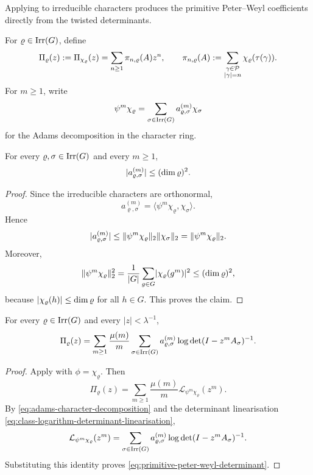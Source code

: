 Applying  to irreducible
characters produces the primitive Peter--Weyl coefficients directly
from the twisted determinants.

For \(\varrho\in\operatorname{Irr}(G)\), define
\begin{equation}\label{eq:primitive-peter-weyl-series}
  \Pi_\varrho(z):=\Pi_{\chi_\varrho}(z)
  =\sum_{n\ge 1}\pi_{n,\varrho}(A)z^n,
  \qquad
  \pi_{n,\varrho}(A)
  :=\sum_{\substack{\gamma\in\mathcal P\\ |\gamma|=n}}
    \chi_\varrho(\tau(\gamma)).
\end{equation}
For \(m\ge 1\), write
\begin{equation}\label{eq:adams-character-decomposition}
  \psi^m\chi_\varrho
  =\sum_{\sigma\in\operatorname{Irr}(G)}a_{\varrho,\sigma}^{(m)}\chi_\sigma
\end{equation}
for the Adams decomposition in the character ring.

\begin{lemma}\label{lem:adams-coefficients-bounded}
  For every \(\varrho,\sigma\in\operatorname{Irr}(G)\) and every \(m\ge 1\),
  \[
    \lvert a_{\varrho,\sigma}^{(m)} \rvert\le (\dim\varrho)^2.
  \]
\end{lemma}

\begin{proof}
  Since the irreducible characters are orthonormal,
  \[
    a_{\varrho,\sigma}^{(m)}
    =\langle \psi^m\chi_\varrho,\chi_\sigma\rangle.
  \]
  Hence
  \[
    \lvert a_{\varrho,\sigma}^{(m)} \rvert
    \le \lVert \psi^m\chi_\varrho \rVert_2\lVert \chi_\sigma \rVert_2
    =\lVert \psi^m\chi_\varrho \rVert_2.
  \]
  Moreover,
  \[
    \lVert \psi^m\chi_\varrho \rVert_2^2
    =\frac{1}{|G|}\sum_{g\in G}\lvert \chi_\varrho(g^m) \rvert^2
    \le (\dim\varrho)^2,
  \]
  because \(\lvert \chi_\varrho(h) \rvert\le \dim\varrho\) for all \(h\in G\).
  This proves the claim.
\end{proof}

\begin{theorem}
  \label{thm:primitive-peter-weyl-determinant}
  For every \(\varrho\in\operatorname{Irr}(G)\) and every \(|z|<\lambda^{-1}\),
  \begin{equation}\label{eq:primitive-peter-weyl-determinant}
    \Pi_\varrho(z)
    =
    \sum_{m\ge 1}\frac{\mu(m)}{m}
      \sum_{\sigma\in\operatorname{Irr}(G)}
        a_{\varrho,\sigma}^{(m)}
        \log\det(I-z^mA_\sigma)^{-1}.
  \end{equation}
\end{theorem}

\begin{proof}
  Apply  with
  \(\phi=\chi_\varrho\). Then
  \[
    \Pi_\varrho(z)
    =
    \sum_{m\ge 1}\frac{\mu(m)}{m}
      \mathcal L_{\psi^m\chi_\varrho}(z^m).
  \]
  By \eqref{eq:adams-character-decomposition} and the determinant
  linearisation \eqref{eq:class-logarithm-determinant-linearisation},
  \[
    \mathcal L_{\psi^m\chi_\varrho}(z^m)
    =
    \sum_{\sigma\in\operatorname{Irr}(G)}
      a_{\varrho,\sigma}^{(m)}
      \log\det(I-z^mA_\sigma)^{-1}.
  \]
  Substituting this identity proves
  \eqref{eq:primitive-peter-weyl-determinant}.
\end{proof}

